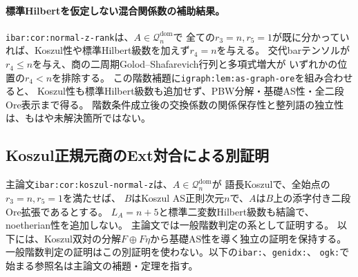 \documentclass[11pt,a4paper]{ltjsarticle}
\begin{document}
\paragraph{標準Hilbertを仮定しない混合関係数の補助結果。}
\texttt{ibar:cor:normal-z-rank}は、$A\in\mathcal Q_n^{\mathrm{dom}}$で
全ての$r_3=n,r_5=1$が既に分かっていれば、Koszul性や標準Hilbert級数を加えず$r_4=n$を与える。
交代barテンソルが$r_4\le n$を与え、商の二周期Golod--Shafarevich行列と多項式増大が
いずれかの位置の$r_4<n$を排除する。
この階数補題に\texttt{igraph:lem:as-graph-ore}を組み合わせると、
Koszul性も標準Hilbert級数も追加せず、PBW分解・基礎AS性・全二段Ore表示まで得る。
階数条件成立後の交換係数の関係保存性と整列語の独立性は、もはや未解決箇所ではない。

\subsection{Koszul正規元商のExt対合による別証明}
\label{note:koszul-normal-z-frobenius}
主論文\texttt{ibar:cor:koszul-normal-z}は、$A\in\mathcal Q_n^{\mathrm{dom}}$が
語長Koszulで、全始点の$r_3=n,r_5=1$を満たせば、
$B$はKoszul AS正則次元$n$で、$A$は$B$上の添字付き二段Ore拡張であるとする。
$L_A=n+5$と標準二変数Hilbert級数も結論で、noetherian性を追加しない。
主論文では一般階数判定の系として証明する。
以下には、Koszul双対の分解$F\oplus F\eta$から基礎AS性を導く独立の証明を保持する。
一般階数判定の証明はこの別証明を使わない。以下の\texttt{ibar:}、\texttt{genidx:}、
\texttt{ogk:}で始まる参照名は主論文の補題・定理を指す。
\end{document}
